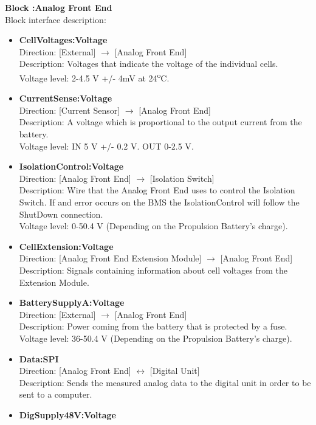 \textbf{Block :Analog Front End}\\
Block interface description:
\begin{itemize}
	\item \textbf{CellVoltages:Voltage}\\
	Direction: [External] $\rightarrow$ [Analog Front End]\\
	Description: Voltages that indicate the voltage of the individual cells.\\
	Voltage level: 2-4.5 V +/- 4mV at 24\textsuperscript{o}C\cite{BMSDocumentation}. 
	\item \textbf{CurrentSense:Voltage}\\
	Direction: [Current Sensor] $\rightarrow$ [Analog Front End]\\
	Description: A voltage which is proportional to the output current from the battery.\\
	Voltage level: IN 5 V +/- 0.2 V. OUT 0-2.5 V\cite{BMSDocumentation}. 
	\item \textbf{IsolationControl:Voltage}\\
	Direction: [Analog Front End] $\rightarrow$ [Isolation Switch]\\
	Description: Wire that the Analog Front End uses to control the Isolation Switch. If and error occurs on the BMS the IsolationControl will follow the ShutDown connection.\\
	Voltage level: 0-50.4 V (Depending on the Propulsion Battery's charge).
	\item \textbf{CellExtension:Voltage}\\
	Direction: [Analog Front End Extension Module] $\rightarrow$ [Analog Front End]\\
	Description: Signals containing information about cell voltages from the Extension Module.
	\item \textbf{BatterySupplyA:Voltage}\\
	Direction: [External] $\rightarrow$ [Analog Front End]\\
	Description: Power coming from the battery that is protected by a fuse.\\
	Voltage level: 36-50.4 V (Depending on the Propulsion Battery's charge).
	\item \textbf{Data:SPI}\\
	Direction: [Analog Front End] $\leftrightarrow$ [Digital Unit]\\
	Description: Sends the measured analog data to the digital unit in order to be sent to a computer.
	\item \textbf{DigSupply48V:Voltage}\\

\end{itemize}
